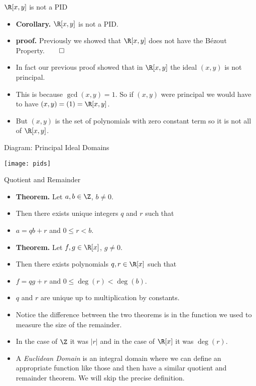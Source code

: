 \documentclass[handout]{beamer}
\begin{document}

\begin{frame}{$\R[x,y]$ is not a PID}

\begin{itemize}
  \item \textbf{Corollary.} $\R[x,y]$ is not a PID.
  \item \textbf{proof.} Previously we showed that $\R[x,y]$ does not have the B\'{e}zout Property.$\qed$
  \item In fact our previous proof showed that in $\R[x,y]$ the ideal $(x,y)$ is not principal.
  \item This is because $\gcd(x,y) = 1$. So if $(x,y)$ were principal we would have to have $(x,y) = (1) = \R[x,y]$.
  \item But $(x,y)$ is the set of polynomials with zero constant term so it is not all of $\R[x,y]$.
\end{itemize}

\end{frame}




\begin{frame}{Diagram: Principal Ideal Domains}

\begin{center}
\texttt{[image: pids]}
\end{center}

\end{frame}




\begin{frame}{Quotient and Remainder}

\begin{itemize}
  \item \textbf{Theorem.} Let $a,b\in\Z$, $b\not=0$.
  \item Then there exists unique integers $q$ and $r$ such that
  \item $a = qb +r$ and $0\leq r < b$.
  \item \textbf{Theorem.} Let $f,g\in\R[x]$, $g\not=0$.
  \item Then there exists polynomials $q,r\in\R[x]$ such that
  \item $f = qg +r$ and $0\leq \deg(r) < \deg(b)$.
  \item $q$ and $r$ are unique up to multiplication by constants.
  \item Notice the difference between the two theorems is in the function we used to measure the size of the remainder.
  \item In the case of $\Z$ it was $|r|$ and in the case of $\R[x]$ it was $\deg(r)$.
  \item A \emph{Euclidean Domain} is an integral domain where we can define an appropriate function like those and then have a similar quotient and remainder theorem. We will skip the precise definition.
\end{itemize}

\end{frame}
\end{document}
